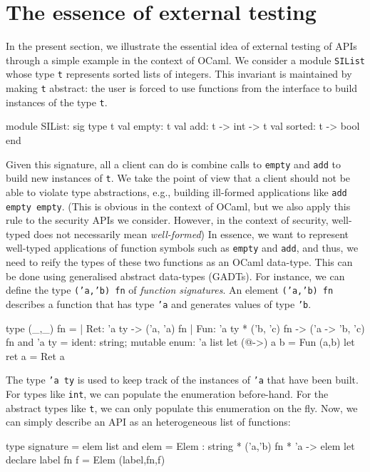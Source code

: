 \documentclass[twocolumn,9pt]{article}
\newcommand{\code}[1]{\texttt{#1}}
\begin{document}
\section{The essence of external testing}\label{sec:example}
In the present section, we illustrate the essential idea of external
testing of APIs through a simple example in the context of OCaml. We
consider a module \code{SIList} whose type \code{t} represents sorted
lists of integers. This invariant is maintained by making \code{t}
abstract: the user is forced to use functions from the interface to
build instances of the type \code{t}.
\begin{ocamlcode}
module SIList: sig
  type t
  val empty: t
  val add: t -> int -> t
  val sorted: t -> bool
end
\end{ocamlcode}
Given this signature, all a client can do is combine calls to
\code{empty} and \code{add} to build new instances of \code{t}. We
take the point of view that a client should not be able to violate
type abstractions, e.g., building ill-formed applications like
\code{add empty empty}. (This is obvious in the context of OCaml, but
we also apply this rule to the security APIs we consider. However, in
the context of security, well-typed does not necessarily mean
\emph{well-formed})
%
In essence, we want to represent well-typed applications of function
symbols such as \code{empty} and \code{add}, and thus, we need to
reify the types of these two functions as an OCaml data-type. This can
be done using generalised abstract data-types (GADTs). For instance,
we can define the type \code{('a,'b) fn} of \emph{function
  signatures}.  An element \code{('a,'b) fn} describes a function that
has type \code{'a} and generates values of type \code{'b}.
\begin{ocamlcode}
type (_,_) fn =
| Ret: 'a ty -> ('a, 'a) fn
| Fun: 'a ty *  ('b, 'c) fn -> ('a -> 'b, 'c) fn
and 'a ty = {ident: string; mutable enum: 'a list}
let (@->) a b = Fun (a,b)
let ret a = Ret a
\end{ocamlcode}
The type \code{'a ty} is used to keep track of the instances of
\code{'a} that have been built. For types like \code{int}, we can
populate the enumeration before-hand. For the abstract types like
\code{t}, we can only populate this enumeration on the fly. Now, we
can simply describe an API as an heterogeneous list of functions:
\begin{ocamlcode}
type signature = elem list
and  elem = Elem : string * ('a,'b) fn * 'a -> elem
let declare label fn f = Elem (label,fn,f)
\end{ocamlcode}
\end{document}
